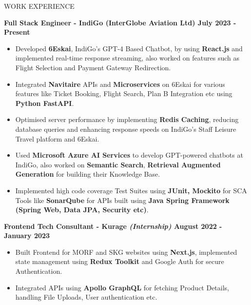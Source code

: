 \documentclass{resume} %
\begin{document}





\begin{rSection}{WORK EXPERIENCE}

{\bf Full Stack Engineer - IndiGo (InterGlobe Aviation Ltd)  \hfill July 2023 - Present }
\begin{itemize}
    \item {\normalfont Developed \textbf{6Eskai}, IndiGo's GPT-4 Based Chatbot, by using \textbf{React.js} and implemented real-time response streaming, also worked on features such as Flight Selection and Payment Gateway Redirection.}
    \item{\normalfont Integrated \textbf{Navitaire} APIs and \textbf{Microservices} on 6Eskai for various features like Ticket Booking, Flight Search, Plan B Integration etc using \textbf{Python FastAPI}.}
    \item {\normalfont Optimised server performance by implementing \textbf{Redis Caching}, reducing database queries and enhancing response speeds on IndiGo’s Staff Leisure Travel platform and 6Eskai.}
    \item {\normalfont Used \textbf{Microsoft Azure AI Services} to develop GPT-powered chatbots at IndiGo, also worked on \textbf{Semantic Search}, \textbf{Retrieval Augmented Generation} for building their Knowledge Base.}
    \item {\normalfont Implemented high code coverage Test Suites using \textbf{JUnit, Mockito} for SCA Tools like \textbf{SonarQube} for APIs built using \textbf{Java Spring Framework (Spring Web, Data JPA, Security etc)}.}
\end{itemize}


{\bf Frontend Tech Consultant - Kurage {\normalfont \emph{(Internship)}}  \hfill August 2022 - January 2023 }
\begin{itemize}

    \item {\normalfont Built Frontend for MORF and SKG websites using \textbf{Next.js}, implemented state management using 
 \textbf{Redux Toolkit} and Google Auth for secure Authentication.}
   \item {\normalfont Integrated APIs using \textbf{{Apollo GraphQL}} for fetching Product Details, handling File Uploads, User authentication etc.} 
\end{itemize}

\end{rSection}
\end{document}

